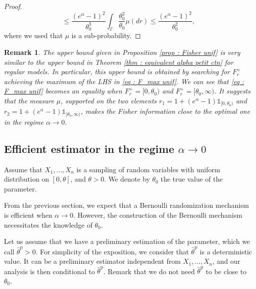 \documentclass[a4paper, 11pt]{article}
\newtheorem{rem}{Remark}
\theoremstyle{definition}
\newcommand{\cE}{{\mathcal{E}}}
\newcommand{\indi}[1]{\mathds{1}_{#1}}
\begin{document}
{\begin{proof}
\begin{equation*}
	\le	\frac{(e^\alpha-1)^2}{\theta_0^3}
	\int_{\cE} \frac{\theta_0^2}{\theta_0} \mu(dr) \le \frac{(e^\alpha-1)^2}{\theta_0^2},
\end{equation*}	
	where we used that $\mu$ is a sub-probability.	
\end{proof}
\begin{rem}
The upper bound given in Proposition \ref{prop : Fisher unif} is very similar
to the upper bound in Theorem \ref{thm : equivalent alpha petit ctn} for regular models. In particular, this upper bound is obtained by searching for $F_r^{+}$ achieving the maximum of the LHS 
in \eqref{eq : F_max unif}. We can see that \eqref{eq : F_max unif}
becomes an equality when $F_r^+=[0,\theta_0)$ and  $F_r^+=[\theta_0,\infty)$. It suggests that the measure $\mu$, supported on the two elements $r_1=1+(e^{\alpha}-1)\indi{[0,\theta_0)}$ and $r_2=1+(e^{\alpha}-1)\indi{[\theta_0,\infty)}$, makes the Fisher information close to the optimal one in the regime $\alpha \to 0$. %
\end{rem}


\subsection{Efficient estimator in the regime $\alpha \to 0$} \label{Ss : efficient est unif}	
	Assume that $X_1,\dots,X_n$ is a sampling of random variables with uniform distribution on $[0,\theta]$, and $\theta>0$. We denote by $\theta_0$ the true value of the parameter.

 From the previous section, we expect that a Bernoulli randomization mechanism is efficient when $\alpha \to 0$. However, the construction of the Bernoulli mechanism necessitates the knowledge of $\theta_0$.
 
 Let us assume that we have a preliminary estimation of the parameter, which we call $\widehat{\theta}^{\text{p}}>0$. For simplicity of the exposition, we consider that 
 $\widehat{\theta}^{\text{p}}$ is a deterministic value. It can be a preliminary estimator independent from $X_1,\dots,X_n$, and our analysis is then conditional to $\widehat{\theta}^{\text{p}}$. Remark that we do not need $\widehat{\theta}^{\text{p}}$ to be close to $\theta_0$.
 
}
\end{document}
